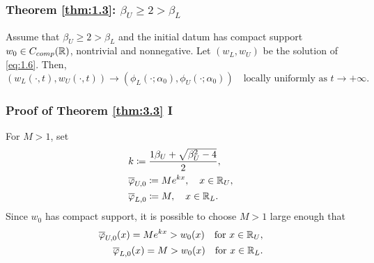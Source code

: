 
\begin{frame}
    \frametitle{Theorem \ref{thm:1.3}: \texorpdfstring{\(\beta_U \geq 2 > \beta_L\)}{betaU >= 2 > betaL}}
    \begin{theorem}
        Assume that \(\beta_U \geq 2 > \beta_L\) and the initial datum has compact support \(w_{0} \in C_{comp}(\mathbb{R})\), nontrivial and nonnegative. Let \((w_L, w_{U})\) be the solution of \eqref{eq:1.6}. Then,
        \begin{equation}
            (w_L(\cdot, t), w_{U}(\cdot, t)) \to (\phi_L(\cdot; \alpha_0), \phi_U(\cdot; \alpha_0)) \quad \text{locally uniformly as } t \to +\infty.
            \label{eq:3.6}
        \end{equation}
        \label{thm:3.3}
    \end{theorem}
\end{frame}


\begin{frame}
    \frametitle{Proof of Theorem \ref{thm:3.3} I}
    \begin{proofs}
        For \(M > 1\), set 
        \begin{align*}
            &k \coloneqq \frac{1\beta_U + \sqrt{\beta_U^2 - 4}}{2}, \\
            &\overline{\varphi}_{U,0} \coloneqq M e^{kx}, \quad x \in \mathbb{R}_U, \\
            &\overline{\varphi}_{L,0} \coloneqq M, \quad x \in \mathbb{R}_L.
        \end{align*}
        Since \(w_0\) has compact support, it is possible to choose \(M > 1\) large enough that
        \begin{align*}
            \overline{\varphi}_{U,0}(x) = M e^{kx} > w_0(x) \quad \text{for } x \in \mathbb{R}_U, \\
            \overline{\varphi}_{L,0}(x) = M > w_0(x) \quad \text{for } x \in \mathbb{R}_L. 
        \end{align*}
    \end{proofs}
\end{frame}


